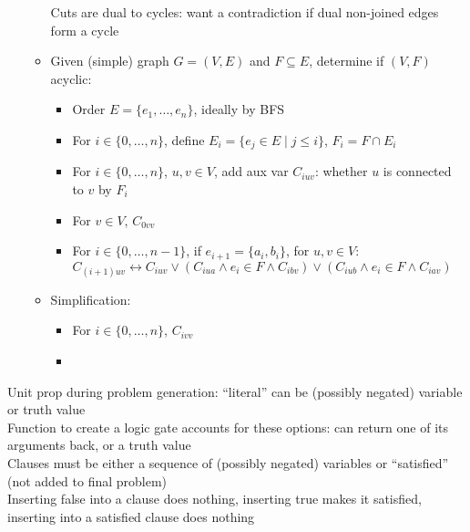 \documentclass{article}
\begin{document}
\begin{itemize}
\begin{itemize}
    Cuts are dual to cycles: want a contradiction if dual non-joined edges form a cycle
  \item
    Given (simple) graph $G = (V, E)$ and $F \subseteq E$, determine if $(V, F)$ acyclic:
    \begin{itemize}
    \item
      Order $E = \{e_1, \ldots, e_n\}$, ideally by BFS
    \item
      For $i \in \{0, \ldots, n\}$, define $E_i = \{e_j \in E \mid j \leq i\}$,
      $F_i = F \cap E_i$
    \item
      For $i \in \{0, \ldots, n\}$, $u, v \in V$, add aux var $C_{iuv}$:
      whether $u$ is connected to $v$ by $F_i$
    \item
      For $v \in V$, $C_{0vv}$
    \item
      For $i \in \{0, \ldots, n-1\}$, if $e_{i+1} = \{a_i, b_i\}$, for $u, v \in V$:\\
      $C_{(i+1)uv} \leftrightarrow C_{iuv} \lor (C_{iua} \land e_i \in F \land C_{ibv}) \lor (C_{iub} \land e_i \in F \land C_{iav})$
    \end{itemize}
    \item
      Simplification:
      \begin{itemize}
      \item
        For $i \in \{0, \ldots, n\}$, $C_{ivv}$
      \item
      \end{itemize}
  \end{itemize}
  
\end{itemize}

Unit prop during problem generation:
``literal'' can be (possibly negated) variable or truth value \\
Function to create a logic gate accounts for these options:
can return one of its arguments back, or a truth value \\
Clauses must be either a sequence of (possibly negated) variables
or ``satisfied'' (not added to final problem) \\
Inserting false into a clause does nothing,
inserting true makes it satisfied,
inserting into a satisfied clause does nothing \\
\end{document}
